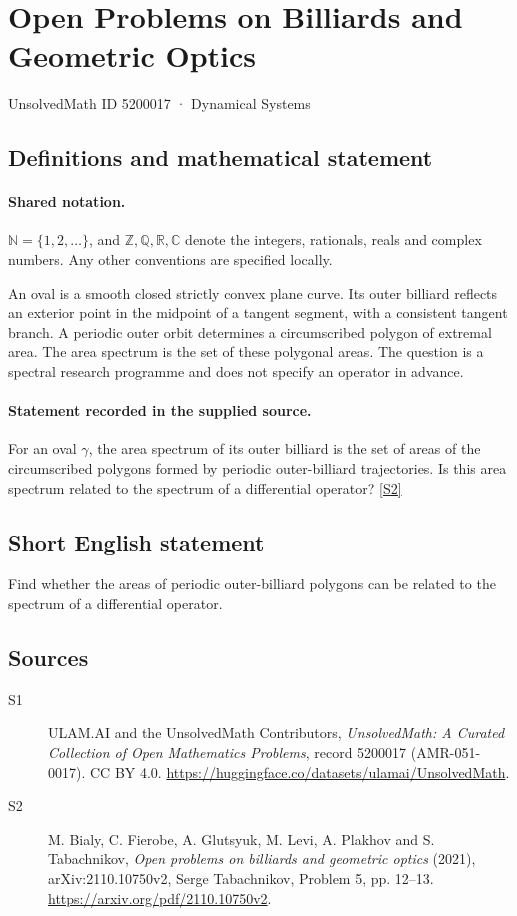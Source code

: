 \documentclass[11pt]{article}
\newcommand{\sref}[2]{\hyperlink{source:#1:#2}{[S#2]}}
\begin{document}
\setcounter{section}{5200016}
\section{Open Problems on Billiards and Geometric Optics}\label{5200017}
{\small\sffamily UnsolvedMath ID 5200017 · Dynamical Systems}
\subsection{Definitions and mathematical statement}

\paragraph{Shared notation.}$\mathbb N=\{1,2,\ldots\}$, and $\mathbb Z,\mathbb Q,\mathbb R,\mathbb C$ denote the integers, rationals, reals and complex numbers. Any other conventions are specified locally.


An oval is a smooth closed strictly convex plane curve. Its outer billiard reflects an exterior point in the midpoint of a tangent segment, with a consistent tangent branch. A periodic outer orbit determines a circumscribed polygon of extremal area. The area spectrum is the set of these polygonal areas. The question is a spectral research programme and does not specify an operator in advance.
\paragraph{Statement recorded in the supplied source.}
For an oval $\gamma$, the area spectrum of its outer billiard is the set of areas of the circumscribed polygons formed by periodic outer-billiard trajectories. Is this area spectrum related to the spectrum of a differential operator? \sref{5200017}{2}
\subsection{Short English statement}
Find whether the areas of periodic outer-billiard polygons can be related to the spectrum of a differential operator.
\subsection{Sources}
\begin{description}
\item[\hypertarget{source:5200017:1}{S1}] ULAM.AI and the UnsolvedMath Contributors, \emph{UnsolvedMath: A Curated Collection of Open Mathematics Problems}, record 5200017 (AMR-051-0017). CC BY 4.0. \url{https://huggingface.co/datasets/ulamai/UnsolvedMath}.
\item[\hypertarget{source:5200017:2}{S2}] M. Bialy, C. Fierobe, A. Glutsyuk, M. Levi, A. Plakhov and S. Tabachnikov, \emph{Open problems on billiards and geometric optics} (2021), arXiv:2110.10750v2, Serge Tabachnikov, Problem 5, pp. 12--13. \url{https://arxiv.org/pdf/2110.10750v2}.
\end{description}
\label{end:5200017}
\end{document}

